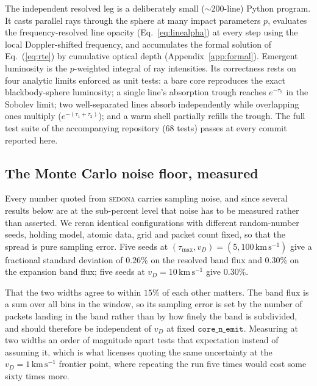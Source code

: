 \documentclass[fleqn,usenatbib]{mnras}
\newcommand{\taus}{\tau_{\mathrm{S}}}
\newcommand{\kms}{\,\mathrm{km\,s^{-1}}}
\begin{document}
The independent resolved leg is a deliberately small ($\sim$200-line) Python
program. It casts parallel rays through the sphere at many impact parameters
$p$, evaluates the frequency-resolved line opacity
(Eq.~\ref{eq:linealpha}) at every step using the local Doppler-shifted
frequency, and accumulates the formal solution of Eq.~(\ref{eq:rte}) by
cumulative optical depth (Appendix~\ref{app:formal}). Emergent luminosity is
the $p$-weighted integral of ray intensities. Its correctness rests on four
analytic limits enforced as unit tests: a bare core reproduces the exact
blackbody-sphere luminosity; a single line's absorption trough reaches
$e^{-\taus}$ in the Sobolev limit; two well-separated lines absorb
independently while overlapping ones multiply
($e^{-(\tau_1+\tau_2)}$); and a warm shell partially refills the trough.
The full test suite of the accompanying repository (68 tests) passes at
every commit reported here.

\subsection{The Monte Carlo noise floor, measured}
\label{sec:noise}

Every number quoted from \textsc{sedona} carries sampling noise, and since
several results below are at the sub-percent level that noise has to be
measured rather than asserted. We reran identical configurations with
different random-number seeds, holding model, atomic data, grid and packet
count fixed, so that the spread is pure sampling error. Five seeds at
$(\tau_{\max},v_D)=(5,100\kms)$ give a fractional standard deviation of
$0.26\%$ on the resolved band flux and $0.30\%$ on the expansion band flux;
five seeds at $v_D=10\kms$ give $0.30\%$.

That the two widths agree to within $15\%$ of each other matters. The band
flux is a sum over all bins in the window, so its sampling error is set by
the number of packets landing in the band rather than by how finely the band
is subdivided, and should therefore be independent of $v_D$ at fixed
$\mathtt{core\_n\_emit}$. Measuring at two widths an order of magnitude apart
tests that expectation instead of assuming it, which is what licenses quoting
the same uncertainty at the $v_D = 1\kms$ frontier point, where repeating the
run five times would cost some sixty times more.
\end{document}
